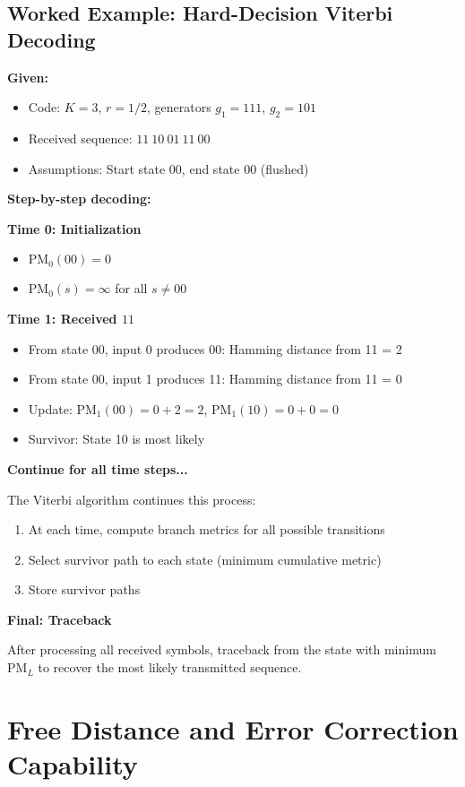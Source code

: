 \subsection{Worked Example: Hard-Decision Viterbi Decoding}

\textbf{Given:}
\begin{itemize}
\item Code: $K=3$, $r=1/2$, generators $g_1=111$, $g_2=101$
\item Received sequence: $11\ 10\ 01\ 11\ 00$
\item Assumptions: Start state 00, end state 00 (flushed)
\end{itemize}

\textbf{Step-by-step decoding:}

\textbf{Time 0: Initialization}
\begin{itemize}
\item $\text{PM}_0(00) = 0$
\item $\text{PM}_0(s) = \infty$ for all $s \neq 00$
\end{itemize}

\textbf{Time 1: Received $11$}
\begin{itemize}
\item From state 00, input 0 produces 00: Hamming distance from 11 = 2
\item From state 00, input 1 produces 11: Hamming distance from 11 = 0
\item Update: $\text{PM}_1(00) = 0 + 2 = 2$, $\text{PM}_1(10) = 0 + 0 = 0$
\item Survivor: State 10 is most likely
\end{itemize}

\textbf{Continue for all time steps...}

The Viterbi algorithm continues this process:
\begin{enumerate}
\item At each time, compute branch metrics for all possible transitions
\item Select survivor path to each state (minimum cumulative metric)
\item Store survivor paths
\end{enumerate}

\textbf{Final: Traceback}

After processing all received symbols, traceback from the state with minimum $\text{PM}_L$ to recover the most likely transmitted sequence.

\section{Free Distance and Error Correction Capability}

